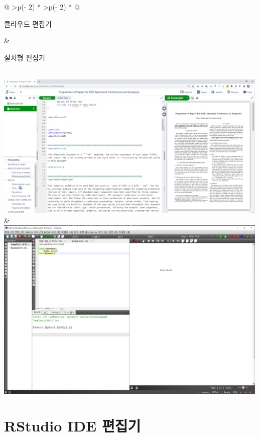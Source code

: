\documentclass[
  letterpaper,
]{book}
\begin{document}
\begin{longtable}[]{@{}
  >{\centering\arraybackslash}p{(\columnwidth - 2\tabcolsep) * }
  >{\centering\arraybackslash}p{(\columnwidth - 2\tabcolsep) * }@{}}
\toprule\noalign{}
\begin{minipage}[b]{\linewidth}\centering
클라우드 편집기
\end{minipage} & \begin{minipage}[b]{\linewidth}\centering
설치형 편집기
\end{minipage} \\
\midrule\noalign{}
\endhead
\bottomrule\noalign{}
\endlastfoot
\includegraphics[width=5.20833in,height=\textheight]{images/overleaf-screenshot.png}
&
\includegraphics[width=5.20833in,height=\textheight]{images/texstudio-screenshot.png} \\
\end{longtable}

\hypertarget{rstudio-ide}{%
\section{RStudio IDE 편집기}\label{rstudio-ide}}
\end{document}
